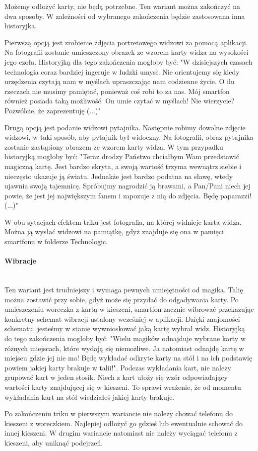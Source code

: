 \documentclass{article}
\numberwithin{equation}{section}
\begin{document}
Możemy odłożyć karty, nie będą potrzebne. Ten wariant można zakończyć na dwa sposoby. W zależności od wybranego zakończenia będzie zastosowana inna historyjka. \par 
Pierwszą opcją jest zrobienie zdjęcia portretowego widzowi za pomocą aplikacji. Na fotografii zostanie umieszczony obrazek ze wzorem karty widza na wysokości jego czoła. Historyjką dla tego zakończenia mogłoby być: "W dzisiejszych czasach technologia coraz bardziej ingeruje w ludzki umysł. Nie orientujemy się kiedy urzędzenia czytają nam w myślach upraszczając nam codzienne życie. O ilu rzeczach nie musimy pamiętać, ponieważ coś robi to za nas. Mój smartfon również posiada taką możliwość. On umie czytać w myślach! Nie wierzycie? Pozwólcie, że zaprezentuję (...)"\par
Drugą opcją jest podanie widzowi pytajnika. Następnie robimy dowolne zdjęcie widzowi, w taki sposób, aby pytajnik był widoczny. Na fotografii, obraz pytajnika zostanie zastąpiony obrazem ze wzorem karty widza. W tym przypadku historyjką mogłoby być: "Teraz drodzy Państwo chciałbym Wam przedstawić magiczną kartę. Jest bardzo skryta, a swoją wartość trzyma wewnątrz siebie i nieczęsto ukazuje ją światu. Jednakże jest bardzo podatna na sławę, wtedy ujawnia swoją tajemnicę. Spróbujmy nagrodzić ją brawami, a Pan/Pani niech jej powie, że jest jej największym fanem i zapozuje z nią do zdjęcia. Będę paparazzi! (...)"\par
W obu sytacjach efektem triku jest fotografia, na której widnieje karta widza. Można ją wysłać widzowi na pamiątkę, gdyż znajduje się ona w pamięci smartfonu w folderze Technologic.
\paragraph{Wibracje}\mbox{}\\
Ten wariant jest trudniejszy i wymaga pewnych umiejętności od magika. Talię można zostawić przy sobie, gdyż może się przydać do odgadywania karty. Po umieszczeniu woreczka z kartą w kieszeni, smartfon zacznie wibrować przekazując konkretny schemat wibracji ustalony wcześniej w aplikacji. Dzięki znajomości schematu, jesteśmy w stanie wywnioskować jaką kartę wybrał widz. Historyjką do tego zakończenia mogłoby być: "Wielu magików odnajduje wybrane karty w różnych miejscach, które wydają się niemożliwe. Ja natomiast odnajdę kartę w miejscu gdzie jej nie ma! Będę wykładać odkryte karty na stół i na ich podstawię powiem jakiej karty brakuje w talii!". Podczas wykładania kart, nie należy grupować kart w jeden stosik. Niech z kart ułoży się wzór  odpowiadający wartości karty znajdującej się w kieszeni. To sprawi wrażenie, że od momentu wykładania kart na stół wiedziałeś jakiej karty brakuje.\par
Po zakończeniu triku w pierwszym wariancie nie należy chować telefonu do kieszeni z woreczkiem. Najlepiej odłożyć go gdzieś lub ewentualnie schować do innej kieszeni. W drugim wariancie natomiast nie należy wyciągać telefonu z kieszeni, aby uniknąć podejrzeń.
\end{document}
